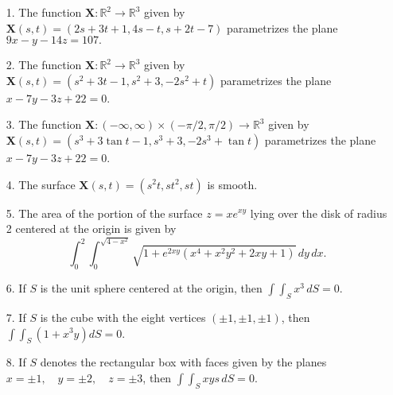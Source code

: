 \documentclass[11pt,letterpaper,boxed]{hmcpset}
\newcommand{\R}{\mathbb{R}}
\newcommand{\pn}[1]{\left( #1 \right)}
\newcommand{\VEC}[1]{\ensuremath{\mathbf{#1}}\xspace}
\begin{document}
\begin{problem}
\begin{enumerate}
\item[1.] The function $\VEC{X}:\R^2\rightarrow\R^3$ given by $\VEC{X}(s,t) = (2s+3t+1,4s-t,s+2t-7)$ parametrizes the plane $9x-y-14z=107.$
\item[2.] The function $\VEC{X}:\R^2\rightarrow\R^3$ given by $\VEC{X}(s,t) = (s^2+3t-1,s^2+3,-2s^2+t)$ parametrizes the plane $x-7y-3z+22=0$.
\item[3.] The function $\VEC{X}:(-\infty,\infty)\times(-\pi/2,\pi/2)\rightarrow\R^3$ given by $\VEC{X}(s,t)=(s^3+3\tan t-1,s^3+3,-2s^3+\tan t)$ parametrizes the plane
$x-7y-3z+22=0$.
\item[4.] The surface $\VEC{X}(s,t)=(s^2t,st^2,st)$ is smooth.
\item[5.] The area of the portion of the surface $z=xe^{xy}$ lying over the disk of radius 2 centered at the origin is given by 
\[
	\int_0^2\int_0^{\sqrt{4-x^2}} \sqrt{1+e^{2xy}\pn{x^4+x^2y^2+2xy+1}}\,dy\,dx.
\]
\item[6.] If $S$ is the unit sphere centered at the origin, then $\int\int_Sx^3\,dS=0$.
\item[7.] If $S$ is the cube with the eight vertices $(\pm1,\pm1,\pm1)$, then $\int\int_S\pn{1+x^3y}dS=0$.
\item[8.] If $S$ denotes the rectangular box with faces given by the planes $x=\pm1, \quad y=\pm2, \quad z=\pm3$, then
$\int\int_Sxys\,dS=0$.
\end{enumerate}
\end{problem}

\begin{solution}
\vfill
\end{solution}
\newpage
\end{document}
